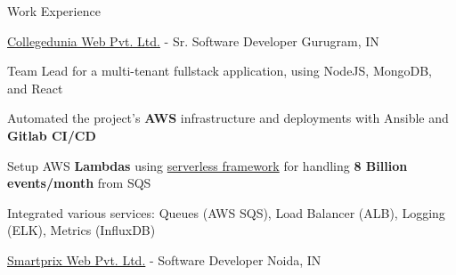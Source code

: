 \documentclass[../resume.tex]{subfiles}
\begin{document}
\begin{rSection}{Work Experience}
\begin{rSubsection}
    {\href{https://go.rohit.page/cd}{Collegedunia Web Pvt. Ltd.}}
    {  -  }
    {Sr. Software Developer}
    {Gurugram, IN}

    \item Team Lead for a multi-tenant fullstack application, using NodeJS, MongoDB, and React
    \item Automated the project's \textbf{AWS} infrastructure and deployments with Ansible and \textbf{Gitlab CI/CD}
    \item Setup AWS \textbf{Lambdas} using \href{https://www.serverless.com/}{serverless framework} for handling \textbf{8 Billion events/month} from SQS
    \item Integrated various services: Queues (AWS SQS), Load Balancer (ALB), Logging (ELK), Metrics (InfluxDB)

\end{rSubsection}

\begin{rSubsection}
    {\href{https://go.rohit.page/smpx}{Smartprix Web Pvt. Ltd.}}
    {  -  }
    {Software Developer}
    {Noida, IN}


\end{rSubsection}
\end{rSection}
\end{document}
